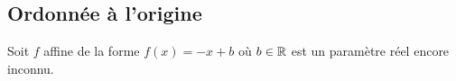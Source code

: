 \subsection{Ordonnée à l'origine}

\begin{frame}{4}

	Soit $f$ affine de la forme $f(x) = -x + b$ où $b\in\mathbb{R}$ est un paramètre réel encore inconnu.
	
\end{frame}


